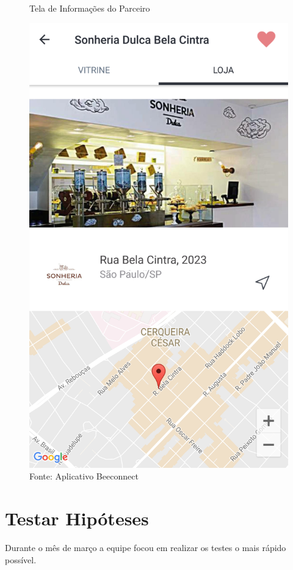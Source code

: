 \begin{figure}[H]
\caption{Tela de Informações do Parceiro}
\centerline{\includegraphics[scale=0.13]{img/info_parceiros}}
\label{fig:info_parceiros}
\caption* {Fonte: Aplicativo Beeconnect}
\end{figure}

\section{Testar Hipóteses}
\label{cha:testar_hipoteses}
Durante o mês de março a equipe focou em realizar os testes o mais rápido possível. 

